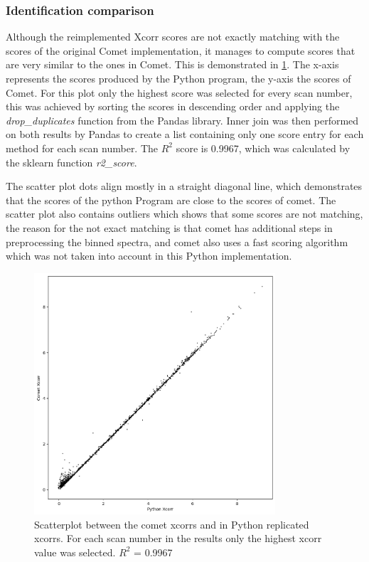 \documentclass[11pt]{article}
\begin{document}
\subsubsection{Identification comparison}
Although the reimplemented Xcorr scores are not exactly matching with the scores of the original Comet implementation, it manages to compute scores that are very similar to the ones in Comet. This is demonstrated in \cref{fig:scatterplot}. The x-axis represents the scores produced by the Python program, the y-axis the scores of Comet. For this plot only the highest score was selected for every scan number, this was achieved by sorting the scores in descending order and applying the \textit{drop\_duplicates} function from the Pandas library. Inner join was then performed on both results by Pandas to create a list containing only one score entry for each method for each scan number. The \(R^2\) score is 0.9967, which was calculated by the sklearn function \textit{r2\_score}.

The scatter plot dots align mostly in a straight diagonal line, which demonstrates that the scores of the python Program are close to the scores of comet. The scatter plot also contains outliers which shows that some scores are not matching, the reason for the not exact matching is that comet has additional steps in preprocessing the binned spectra, and comet also uses a fast scoring algorithm which was not taken into account in this Python implementation. 
\begin{figure}[ht]
\centering
\includegraphics[width=0.8\textwidth]{figs/scatterplot.png}
\caption{Scatterplot between the comet xcorrs and in Python replicated xcorrs. For each scan number in the results only the highest xcorr value was selected. \(R^2\) = 0.9967}
\label{fig:scatterplot}
\end{figure}
\end{document}
